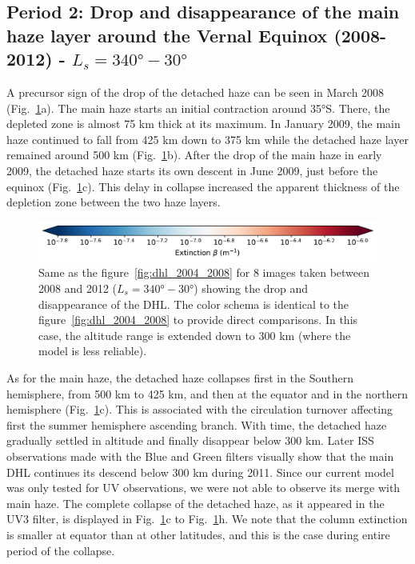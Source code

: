 \subsection{Period 2: Drop and disappearance of the main haze layer around the Vernal Equinox (2008-2012) - $L_s=\ang{340}-\ang{30}$}

A precursor sign of the drop of the detached haze can be seen in March 2008 (Fig.~\ref{fig:dhl_2008_2012}a).
The main haze starts an initial contraction around \ang{35}S. There, the depleted zone is almost
75 km thick at its maximum. In January 2009, the main haze continued to fall from 425 km down to 375 km
while the detached haze layer remained around 500 km (Fig.~\ref{fig:dhl_2008_2012}b). After the drop
of the main haze in early 2009, the detached haze starts its own descent in June 2009, just before the equinox
(Fig.~\ref{fig:dhl_2008_2012}c). This delay in collapse increased the apparent thickness of the depletion
zone between the two haze layers.

\begin{figure}[!ht]
\includegraphics[width=.5\textwidth]{Fig/Extinction_colorbar}
\caption{Same as the figure~\ref{fig:dhl_2004_2008} for 8 images taken between 2008 and 2012
($L_s=\ang{340}-\ang{30}$) showing the drop and disappearance of the DHL.
The color schema is identical to the figure~\ref{fig:dhl_2004_2008} to provide
direct comparisons. In this case, the altitude range is extended down to 300 km
(where the model is less reliable).}
\label{fig:dhl_2008_2012}
\end{figure}

As for the main haze, the detached haze collapses first in the Southern hemisphere, from 500 km to 425 km, and
then at the equator and in the northern hemisphere (Fig.~\ref{fig:dhl_2008_2012}c).
This is associated with the circulation turnover affecting first the summer hemisphere ascending branch.
With time, the detached haze gradually settled in altitude and finally disappear below 300 km.
Later ISS observations made with the Blue and Green filters visually show that the main DHL continues
its descend below 300 km during 2011. Since our current model was only tested for UV observations, we were not able
to observe its merge with main haze.
The complete collapse of the detached haze, as it appeared in the UV3 filter, is displayed in Fig.~\ref{fig:dhl_2008_2012}c to
Fig.~\ref{fig:dhl_2008_2012}h. We note that the column extinction is smaller at equator than at
other latitudes, and this is the case during entire period of the collapse.

